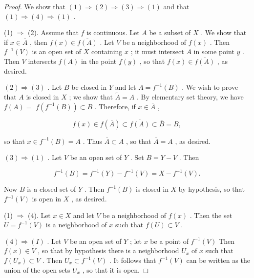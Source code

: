 \begin{proof}
We show that \(\left( 1\right)  \Rightarrow  \left( 2\right)  \Rightarrow  \left( 3\right)  \Rightarrow  \left( 1\right)\) and that \(\left( 1\right)  \Rightarrow  \left( 4\right)  \Rightarrow  \left( 1\right)\) .

(1) \(\Rightarrow\) (2). Assume that \(f\) is continuous. Let \(A\) be a subset of \(X\) . We show that if \(x \in  \bar{A}\) , then \(f\left( x\right)  \in  \overline{f\left( A\right) }\) . Let \(V\) be a neighborhood of \(f\left( x\right)\) . Then \({f}^{-1}\left( V\right)\) is an open set of \(X\) containing \(x\) ; it must intersect \(A\) in some point \(y\) . Then \(V\) intersects \(f\left( A\right)\) in the point \(f\left( y\right)\) , so that \(f\left( x\right)  \in  \overline{f\left( A\right) }\) , as desired.

\(\left( 2\right)  \Rightarrow  \left( 3\right)\) . Let \(B\) be closed in \(Y\) and let \(A = {f}^{-1}\left( B\right)\) . We wish to prove that \(A\) is closed in \(X\) ; we show that \(\widetilde{A} = A\) . By elementary set theory, we have \(f\left( A\right)  =\)  \(f\left( {{f}^{-1}\left( B\right) }\right)  \subset  B\) . Therefore, if \(x \in  \bar{A}\) ,

\[
f\left( x\right)  \in  f\left( \bar{A}\right)  \subset  \overline{f\left( A\right) } \subset  \bar{B} = B,
\]

so that \(x \in  {f}^{-1}\left( B\right)  = A\) . Thus \(\bar{A} \subset  A\) , so that \(\bar{A} = A\) , as desired.

\(\left( 3\right)  \Rightarrow  \left( 1\right)\) . Let \(V\) be an open set of \(Y\) . Set \(B = Y - V\) . Then

\[
{f}^{-1}\left( B\right)  = {f}^{-1}\left( Y\right)  - {f}^{-1}\left( V\right)  = X - {f}^{-1}\left( V\right) .
\]

Now \(B\) is a closed set of \(Y\) . Then \({f}^{-1}\left( B\right)\) is closed in \(X\) by hypothesis, so that \({f}^{-1}\left( V\right)\) is open in \(X\) , as desired.

(1) \(\Rightarrow\) (4). Let \(x \in  X\) and let \(V\) be a neighborhood of \(f\left( x\right)\) . Then the set \(U = {f}^{-1}\left( V\right)\) is a neighborhood of \(x\) such that \(f\left( U\right)  \subset  V\) .

\(\left( 4\right)  \Rightarrow  \left( I\right)\) . Let \(V\) be an open set of \(Y\) ; let \(x\) be a point of \({f}^{-1}\left( V\right)\) Then \(f\left( x\right)  \in  V\) , so that by hypothesis there is a neighborhood \({U}_{x}\) of \(x\) such that \(f\left( {U}_{x}\right)  \subset  V\) . Then \({U}_{x} \subset  {f}^{-1}\left( V\right)\) . It follows that \({f}^{-1}\left( V\right)\) can be written as the union of the open sets \({U}_{x}\) , so that it is open.
\end{proof}

